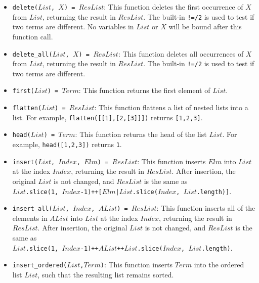 \begin{itemize}
\item \texttt{delete($List$, $X$) = $ResList$}: This function deletes the first occurrence of $X$ from $List$, returning the result in $ResList$. The built-in \verb+!=/2+ is used to test if two terms are different. No variables in $List$ or $X$ will be bound after this function call.
\item \texttt{delete\_all($List$, $X$) = $ResList$}: This function deletes all occurrences of $X$ from $List$, returning the result in $ResList$. The built-in \verb+!=/2+ is used to test if two terms are different.
\item \texttt{first($List$) = $Term$}: This function returns the first element of $List$. 
\item \texttt{flatten($List$) = $ResList$}: This function flattens a list of nested lists into a list. For example, \texttt{flatten([[1],[2,[3]]])} returns \texttt{[1,2,3]}.
\item \texttt{head($List$) = $Term$}: This function returns the head of the list $List$. For example, \texttt{head([1,2,3])} returns \texttt{1}.
\item \texttt{insert($List$, $Index$, $Elm$) = $ResList$}: This function inserts $Elm$ into $List$ at the index $Index$, returning the result in $ResList$. After insertion, the original $List$ is not changed, and $ResList$ is the same as \\ \texttt{$List$.slice(1, $Index$-1)++[$Elm$|$List$.slice($Index$, $List$.length)]}.
\item \texttt{insert\_all($List$, $Index$, $AList$) = $ResList$}: This function inserts all of the elements in $AList$ into $List$ at the index $Index$, returning the result in $ResList$. After insertion, the original $List$ is not changed, and $ResList$ is the same as \\ \texttt{$List$.slice(1, $Index$-1)++$AList$++$List$.slice($Index$, $List$.length)}.

\item \texttt{insert\_ordered($List$,$Term$)}: This function inserts $Term$ into the ordered list $List$, such that the resulting list remains sorted.


\end{itemize}
